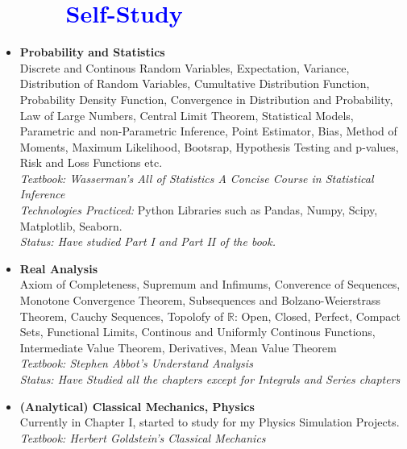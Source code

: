 \documentclass[12pt]{article}
\begin{document}
\section*{\textcolor{blue}{\ \ \ \ \  Self-Study}}
\begin{itemize}
    \item[] \textbf{Probability and Statistics}
        \\
        Discrete and Continous Random Variables, Expectation, Variance, Distribution of Random Variables, Cumultative Distribution
        Function, Probability Density Function, Convergence in Distribution and Probability, Law of Large Numbers, Central Limit Theorem,
        Statistical Models, Parametric and non-Parametric Inference, Point Estimator, Bias, Method of Moments, Maximum Likelihood,
        Bootsrap, Hypothesis Testing and p-values, Risk and Loss Functions etc.
        \\
        \textit{Textbook: Wasserman's All of Statistics  A Concise Course in Statistical Inference}
        \\
        \textit{Technologies Practiced:} Python Libraries such as Pandas, Numpy, Scipy, Matplotlib, Seaborn.
        \\
        \textit{Status: Have studied Part I and Part II of the book.}
    \item[] \textbf{Real Analysis}
        \\
        Axiom of Completeness, Supremum and Infimums, Converence of Sequences, Monotone Convergence Theorem, Subsequences and
        Bolzano-Weierstrass Theorem, Cauchy Sequences, Topolofy of $\mathbb{R}$: Open, Closed, Perfect, Compact Sets, Functional Limits,
        Continous and Uniformly Continous Functions, Intermediate Value Theorem, Derivatives, Mean Value Theorem
        \\
        \textit{Textbook: Stephen Abbot's Understand Analysis}
        \\
        \textit{Status: Have Studied all the chapters except for Integrals and Series chapters}
    \item[] \textbf{(Analytical) Classical Mechanics, Physics}
        \\
        Currently in Chapter I, started to study for my Physics Simulation Projects.
        \\
        \textit{Textbook: Herbert Goldstein's Classical Mechanics}

\end{itemize}
\end{document}
